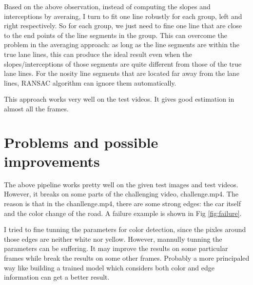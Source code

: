 \documentclass[12pt]{article}
\begin{document}
Based on the above observation, instead of computing the slopes and interceptions by averaing, I turn to fit one line robustly for each group, left and right respectively. So for each group, we just need to fine one line that are close to the end points of the line segments in the group. This can overcome the problem in the averaging approach: as long as the line segments are within the true lane lines, this can produce the ideal result even when the slopes/interceptions of those segments are quite different from those of the true lane lines. For the nosity line segments that are located far away from the lane lines, RANSAC algorithm can ignore them automatically.

This approach works very well on the test videos. It gives good estimation in almost all the frames.



\section{Problems and possible improvements}
The above pipeline works pretty well on the given test images and test videos. However, it breaks on some parts of the challenging video, challenge.mp4. The reason is that in the chanllenge.mp4, there are some strong edges: the car itself and the color change of the road. A failure example is shown in Fig \ref{fig:failure}. 

I tried to fine tunning the parameters for color detection, since the pixles around those edges are neither white nor yellow. However, mannully tunning the parameters can be suffering. It may improve the results on some particular frames while break the results on some other frames. Probably a more principaled way like building a trained model which considers both color and edge information can get a better result.
\end{document}
